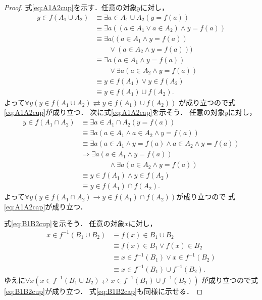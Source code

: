     \begin{proof}
      式\eqref{eq:A1A2cup}を示す．任意の対象$y$に対し，
      \begin{align*}
        y \in f(A_1 \cup A_2) 
        & \equiv \exists a \in A_1 \cup A_2 (y=f(a)) \\
        & \equiv \exists a ( (a \in A_1 \lor a \in A_2 ) 
        \land y =f(a)) \\
        & \equiv \exists a ( ( a \in A_1 \land y=f(a)) \\
        & \qquad \lor (a \in A_2 \land y=f(a))) \\
        & \equiv \exists a ( a \in A_1 \land y = f(a) ) \\
        & \qquad \lor \exists a ( a \in A_2 \land y=f(a) ) \\
        & \equiv y \in f(A_1) \lor y \in f(A_2) \\
        & \equiv y \in f(A_1) \cup f(A_2).
      \end{align*}
      よって$\forall y ( y \in f(A_1 \cup A_2) 
      \rightleftarrows y \in f(A_1) \cup f(A_2))$
      が成り立つので式\eqref{eq:A1A2cup}が成り立つ．
      次に式\eqref{eq:A1A2cap}を示そう．
      任意の対象$y$に対し，
      \begin{align*}
        y \in f(A_1 \cap A_2) 
        & \equiv \exists a \in A_1 \cap A_2 ( y=f(a)) \\
        & \equiv \exists a ( a \in A_1 \land a \in A_2 
        \land y=f(a)) \\
        & \equiv \exists a ( a \in A_1 \land y=f(a)
        \land a \in A_2 \land y=f(a)) \\
        & \Longrightarrow \exists a ( a \in A_1
        \land y=f(a) ) \\ 
        & \qquad \qquad \land \exists a (a \in A_2 \land y=f(a)) \\
        & \equiv y \in f(A_1) \land y \in f(A_2) \\
        & \equiv y \in f(A_1) \cap f(A_2).
      \end{align*}
      よって$\forall y ( y \in f(A_1 \cap A_2) 
      \to y \in f(A_1) \cap f(A_2))$が成り立つので
      式\eqref{eq:A1A2cap}が成り立つ．

      式\eqref{eq:B1B2cup}を示そう．
      任意の対象$x$に対し，
      \begin{align*}
        x \in f^{-1}(B_1 \cup B_2)
        & \equiv f(x) \in B_1 \cup B_2 \\
        & \equiv f(x) \in B_1 \lor f(x) \in B_2 \\
        & \equiv x \in f^{-1}(B_1) \lor x \in f^{-1} (B_2) \\
        & \equiv x \in f^{-1}(B_1) \cup f^{-1}(B_2).
      \end{align*}
      ゆえに$\forall x ( x \in f^{-1}(B_1 \cup B_2)
      \rightleftarrows x \in f^{-1}(B_1) \cup f^{-1} (B_2))$
      が成り立つので式\eqref{eq:B1B2cup}が成り立つ．
      式\eqref{eq:B1B2cap}も同様に示せる．
    \end{proof}
